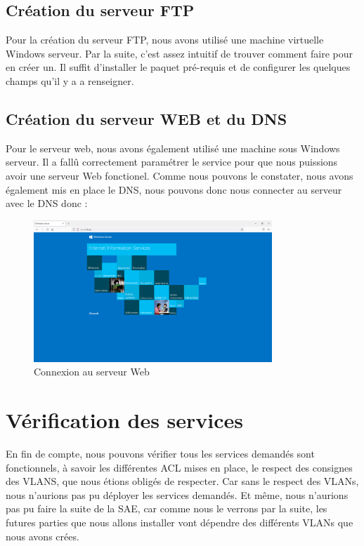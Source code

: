 \documentclass[12pt, a4paper]{article}
\begin{document}
		\subsection{Création du serveur FTP}
		Pour la création du serveur FTP, nous avons utilisé une machine virtuelle Windows
		serveur. Par la suite, c'est assez intuitif de trouver comment faire pour en créer un. 
		Il suffit d'installer le paquet pré-requis et de configurer les quelques champs qu'il y a 
		a renseigner. 

		\subsection{Création du serveur WEB et du DNS}

		Pour le serveur web, nous avons également utilisé une machine sous Windows serveur. 
		Il a fallû correctement paramétrer le service pour que nous puissions avoir une 
		serveur Web fonctionel. Comme nous pouvons le constater, nous avons également mis en place
		le DNS, nous pouvons donc nous connecter au serveur avec le DNS donc : 
		\begin{figure}[H]
			\centering
			\includegraphics[width=0.8\textwidth]{../screens/routeur/web.png}
			\caption{Connexion au serveur Web}
			\label{fig:web}
		\end{figure}
	\newpage
	\section{Vérification des services}
	En fin de compte, nous pouvons vérifier tous les services demandés sont fonctionnels, à savoir
	les différentes ACL mises en place, le respect des consignes des VLANS, que nous étions 
	obligés de respecter. Car sans le respect des VLANs, nous n'aurions pas pu déployer les 
	services demandés. Et même, nous n'aurions pas pu faire la suite de la SAE, car comme nous
	le verrons par la suite, les futures parties que nous allons installer vont dépendre des
	différents VLANs que nous avons crées. 
\end{document}
